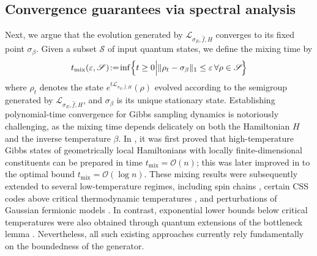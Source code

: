 \documentclass[11pt]{amsart}
\newcommand{\1}{\mathbbm{1}}
\renewcommand{\epsilon}{\varepsilon}
\theoremstyle{plain}
\theoremstyle{definition}
\theoremstyle{remark}
\numberwithin{equation}{section}
\begin{document}


\smallskip

 \subsection{Convergence guarantees via spectral analysis}\label{sec.fastconv}

\noindent Next, we argue that the evolution generated by $\mathcal{L}_{\sigma_E,\widehat{f},H}$ converges to its fixed point $\sigma_\beta$.
Given a subset $\mathscr{S}$ of input quantum states, we define the mixing time by
\[
t_{\operatorname{mix}}(\epsilon,\mathscr{S})
\!:=\!\inf\Bigl\{ t \ge 0 \Big| \| \rho_t - \sigma_\beta \|_1 \le \epsilon \,\forall\rho \in \mathscr{S}\! \Bigr\}
\]
where $\rho_t$ denotes the state $e^{t\mathcal{L}_{\sigma_E,\widehat{f},H}}(\rho)$ evolved according to the semigroup generated by $\mathcal{L}_{\sigma_E,\widehat{f},H}$, and $\sigma_\beta$ is its unique stationary state. 
Establishing polynomial-time convergence for Gibbs sampling dynamics is notoriously challenging, as the mixing time depends delicately on both the Hamiltonian $H$ and the inverse temperature $\beta$. In \cite{rouze2024efficient}, it was first proved that high-temperature Gibbs states of geometrically local Hamiltonians with locally finite-dimensional constituents can be prepared in time $t_{\mathrm{mix}}=\mathcal{O}(n)$; this was later improved in \cite{rouze2411optimal} to the optimal bound $t_{\mathrm{mix}}=\mathcal{O}(\log n)$. These mixing results were subsequently extended to several low-temperature regimes, including spin chains \cite{https://doi.org/10.48550/arxiv.2510.08533}, certain CSS codes above critical thermodynamic temperatures \cite{stengele2025modified}, and perturbations of Gaussian fermionic models \cite{vsmid2025rapid,vsmid2025polynomial,tong2025fast}. In contrast, exponential lower bounds below critical temperatures were also obtained through quantum extensions of the bottleneck lemma \cite{gamarnik2024slow}. Nevertheless, all such existing approaches currently rely fundamentally on the boundedness of the generator.
\end{document}
